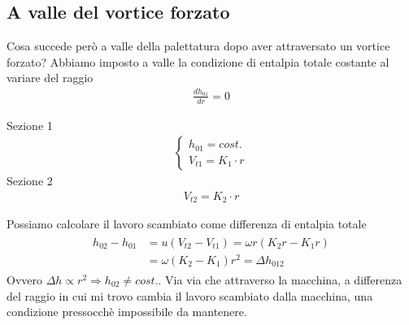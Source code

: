 \subsection{A valle del vortice forzato}
Cosa succede però a valle della palettatura dopo aver attraversato un vortice forzato? 
Abbiamo imposto a valle la condizione di entalpia totale costante al variare del raggio
\begin{align*}
\frac{dh_{01}}{dr} = 0
\end{align*}
\begin{multicols}{2}
Sezione 1
\begin{align*}
\begin{cases}
h_{01} = cost.\\
V_{t1} = K_1 \cdot r
\end{cases}
\end{align*}
\break
Sezione 2
\begin{align*}
V_{t2} = K_2 \cdot r
\end{align*}
\end{multicols}
Possiamo calcolare il lavoro scambiato come differenza di entalpia totale
\begin{align*}
\begin{split}
h_{02} - h_{01} &= u (V_{t2} - V_{t1} ) = \omega r (K_2 r - K_1 r) \\
&= \omega (K_2 - K_1) r^2 = \Delta h_{012}
\end{split}
\end{align*}
Ovvero $\Delta h \propto r^2 \Rightarrow h_{02} \neq  cost.$. Via via che attraverso la macchina, a differenza del raggio in cui mi trovo cambia il lavoro scambiato dalla macchina, una condizione pressocchè impossibile da mantenere.

